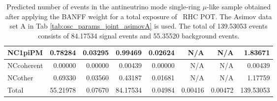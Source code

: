 \begin{table}
\begin{tabular} { | l ||r | r | r | r | r | r | | r | }
	 NC1piPM      & 0.78284              & 0.03295              & 0.99469              & 0.02624              & N/A                  & N/A                  & 1.83671              \\ \hline
	 NCcoherent   & 0.00000              & 0.00000              & 0.00439              & 0.00000              & N/A                  & N/A                  & 0.00439              \\ \hline
	 NCother      & 0.69330              & 0.03560              & 0.43187              & 0.01681              & N/A                  & N/A                  & 1.17759              \\ \hline
	\hline
	 Total        & 55.21978             & 0.07670              & 84.17534             & 0.04984              & 0.00416              & 0.00472              & 139.53053            \\ \hline
	
	\end{tabular}
	\caption{Predicted number of events in the antineutrino mode single-ring $\mu$-like sample obtained after applying the BANFF weight for a total exposure of \TotalPotNuBarRunOneNine\ RHC POT. The Asimov data set A in Tab \ref{tab:osc_params_joint_asimovA} is used. The total of 139.53053 events consists of 84.17534 signal events and 55.35520 background events.}
	\label{tab:event_rates_exp_RHC1Rmu_Run1-9d}
\end{table}

%
%
%
%
%
%
%

